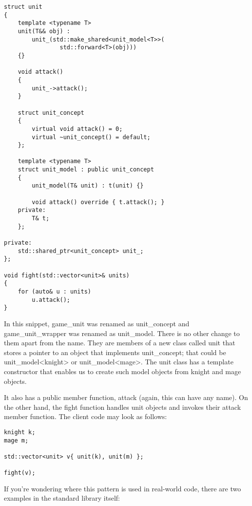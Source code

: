 \begin{lstlisting}[style=styleCXX]
struct unit
{
	template <typename T>
	unit(T&& obj) :
		unit_(std::make_shared<unit_model<T>>(
				std::forward<T>(obj)))
	{}
	
	void attack()
	{
		unit_->attack();
	}

	struct unit_concept
	{
		virtual void attack() = 0;
		virtual ~unit_concept() = default;
	};

	template <typename T>
	struct unit_model : public unit_concept
	{
		unit_model(T& unit) : t(unit) {}
		
		void attack() override { t.attack(); }
	private:
		T& t;
	};

private:
	std::shared_ptr<unit_concept> unit_;
};

void fight(std::vector<unit>& units)
{
	for (auto& u : units)
		u.attack();
}
\end{lstlisting}

In this snippet, game\_unit was renamed as unit\_concept and game\_unit\_wrapper was renamed as unit\_model. There is no other change to them apart from the name. They are members of a new class called unit that stores a pointer to an object that implements unit\_concept; that could be unit\_model<knight> or unit\_model<mage>. The unit class has a template constructor that enables us to create such model objects from knight and mage objects.

It also has a public member function, attack (again, this can have any name). On the other hand, the fight function handles unit objects and invokes their attack member function. The client code may look as follows:

\begin{lstlisting}[style=styleCXX]
knight k;
mage m;

std::vector<unit> v{ unit(k), unit(m) };

fight(v);
\end{lstlisting}

If you’re wondering where this pattern is used in real-world code, there are two examples in the standard library itself:

